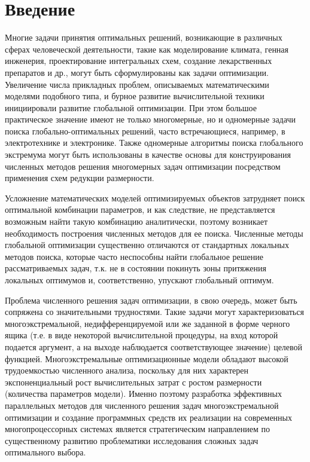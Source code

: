 \documentclass{report}
\begin{document}
\setcounter{page}{2}

\tableofcontents
\newpage

\section*{Введение}
Многие задачи принятия оптимальных решений, возникающие в различных сферах человеческой деятельности, такие как моделирование климата, генная инженерия, проектирование интегральных схем, создание лекарственных препаратов и др., могут быть сформулированы как задачи оптимизации. Увеличение числа прикладных проблем, описываемых математическими моделями подобного типа, и бурное развитие вычислительной техники инициировали развитие глобальной оптимизации. При этом большое практическое значение имеют не только многомерные, но и одномерные задачи поиска глобально-оптимальных решений, часто встречающиеся, например, в электротехнике и электронике. Также одномерные алгоритмы поиска глобального экстремума могут быть использованы в качестве основы для конструирования численных методов решения многомерных задач оптимизации посредством применения схем редукции размерности.

Усложнение математических моделей оптимизируемых объектов затрудняет поиск оптимальной комбинации параметров, и как следствие, не представляется возможным найти такую комбинацию аналитически, поэтому возникает необходимость построения численных методов для ее поиска. Численные методы глобальной оптимизации существенно отличаются от стандартных локальных методов поиска, которые часто неспособны найти глобальное решение рассматриваемых задач, т.к. не в состоянии покинуть зоны притяжения локальных оптимумов и, соответственно, упускают глобальный оптимум.

Проблема численного решения задач оптимизации, в свою очередь, может быть сопряжена со значительными трудностями. Такие задачи могут характеризоваться многоэкстремальной, недифференцируемой или же заданной в форме черного ящика (т.е. в виде некоторой вычислительной процедуры, на вход которой подается аргумент, а на выходе наблюдается соответствующее значение) целевой функцией. Многоэкстремальные оптимизационные модели обладают высокой трудоемкостью численного анализа, поскольку для них характерен экспоненциальный рост вычислительных затрат с ростом размерности (количества параметров модели).  Именно поэтому разработка эффективных параллельных методов для численного решения задач многоэкстремальной оптимизации и создание программных средств их реализации на современных многопроцессорных системах является стратегическим направлением по существенному развитию проблематики исследования сложных задач оптимального выбора.
\end{document}
